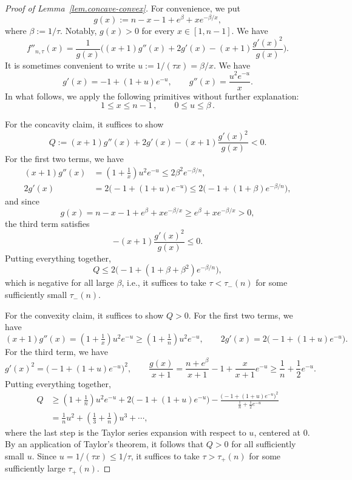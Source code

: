 \documentclass{article}
\theoremstyle{plain}
\theoremstyle{definition}
\begin{document}
\begin{proof}[Proof of Lemma~\ref{lem.concave-convex}]
For convenience, we put
\[
g(x)
:=n-x-1+e^{\beta}+xe^{-\beta/x},
\]
where $\beta:=1/\tau$.
Notably, $g(x)>0$ for every $x\in[1,n-1]$.
We have
\[
f''_{n,\tau}(x)
=\frac{1}{g(x)}\bigg((x+1)g''(x)+2g'(x)-(x+1)\frac{g'(x)^2}{g(x)}\bigg).
\]
It is sometimes convenient to write $u:=1/(\tau x)=\beta/x$.
We have
\[
g'(x)
=-1+(1+u)e^{-u},
\qquad
g''(x)
=\frac{u^2e^{-u}}{x}.
\]
In what follows, we apply the following primitives without further explanation:
\[
1\leq x\leq n-1\,,
\qquad
0\leq u\leq \beta\,.
\]

For the concavity claim, it suffices to show
\[
Q
:=(x+1)g''(x)+2g'(x)-(x+1)\frac{g'(x)^2}{g(x)}
<0.
\]
For the first two terms, we have
\begin{align*}
(x+1)g''(x)
&=(1+\tfrac{1}{x})u^2e^{-u}
\leq 2\beta^2e^{-\beta/n},\\[0.5em]
2g'(x)
&=2\big(-1+(1+u)e^{-u}\big)
\leq2\big(-1+(1+\beta)e^{-\beta/n}\big),
\end{align*}
and since
\[
g(x)
=n-x-1+e^{\beta}+xe^{-\beta/x}
\geq e^{\beta}+xe^{-\beta/x}
> 0,
\]
the third term satisfies
\[
-(x+1)\frac{g'(x)^2}{g(x)}
\leq0.
\]
Putting everything together,
\[
Q
\leq 2\big(-1+(1+\beta+\beta^2)e^{-\beta/n}\big),
\]
which is negative for all large $\beta$, i.e., it suffices to take $\tau<\tau_-(n)$ for some sufficiently small $\tau_-(n)$.

For the convexity claim, it suffices to show $Q>0$.
For the first two terms, we have
\[
(x+1)g''(x)
=(1+\tfrac{1}{x})u^2e^{-u}
\geq(1+\tfrac{1}{n})u^2e^{-u},
\qquad
2g'(x)
=2\big(-1+(1+u)e^{-u}\big).
\]
For the third term, we have
\[
g'(x)^2
=\big(-1+(1+u)e^{-u}\big)^2,
\qquad
\frac{g(x)}{x+1}
=\frac{n+e^\beta}{x+1}-1+\frac{x}{x+1}e^{-u}
\geq\frac{1}{n}+\frac{1}{2}e^{-u}.
\]
Putting everything together,
\begin{align*}
Q
&\geq(1+\tfrac{1}{n})u^2e^{-u}+2\big(-1+(1+u)e^{-u}\big)-\frac{\big(-1+(1+u)e^{-u}\big)^2}{\frac{1}{n}+\frac{1}{2}e^{-u}}\\
&=\tfrac{1}{n}u^2+(\tfrac{1}{3}+\tfrac{1}{n})u^3+\cdots,
\end{align*}
where the last step is the Taylor series expansion with respect to $u$, centered at $0$.
By an application of Taylor's theorem, it follows that $Q>0$ for all sufficiently small $u$.
Since $u=1/(\tau x)\leq 1/\tau$, it suffices to take $\tau>\tau_+(n)$ for some sufficiently large $\tau_+(n)$.
\end{proof}
\end{document}
